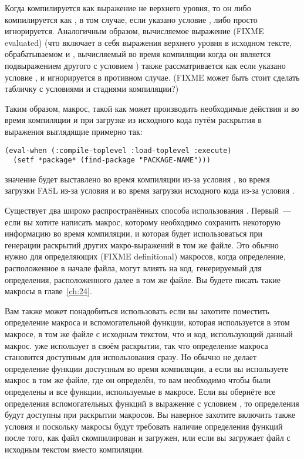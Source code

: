 Когда  компилируется как выражение не верхнего уровня, то он либо
компилируется как , в том случае, если указано условие , либо
просто игнорируется.  Аналогичным образом, вычисляемое выражение (FIXME evaluated)
 (что включает в себя выражения  верхнего уровня в
исходном тексте, обрабатываемом  и , вычисляемый во время
компиляции когда он является подвыражением другого  с условием
) также рассматривается как  если указано условие
, и игнорируется в противном случае. (FIXME может быть стоит сделать
табличку с условиями и стадиями компиляции?)

Таким образом, макрос, такой как  может производить необходимые действия
и во время компиляции и при загрузке из исходного кода путём раскрытия в выражения
 выглядящие примерно так:

\begin{lstlisting}
(eval-when (:compile-toplevel :load-toplevel :execute)
  (setf *package* (find-package "PACKAGE-NAME")))
\end{lstlisting}

\noindent{}значение  будет выставлено во время компиляции из-за условия
, во время загрузки FASL из-за условия  и во
время загрузки исходного кода из-за условия .

Существует два широко распространённых способа использования . Первый~---
если вы хотите написать макрос, которому необходимо сохранить некоторую информацию во
время компиляции, и которая будет использоваться при генерации раскрытий других
макро-выражений в том же файле.  Это обычно нужно для определяющих (FIXME definitional)
макросов, когда определение, расположенное в начале файла, могут влиять на код,
генерируемый для определения, расположенного далее в том же файле.  Вы будете писать такие
макросы в главе~\ref{ch:24}.

Вам также может понадобиться использовать  если вы захотите поместить
определение макроса и вспомогательной функции, которая используется в этом макросе, в том
же файле с исходным текстом, что и код, использующий данный макрос.  уже
использует  в своём раскрытии, так что определение макроса становится
доступным для использования сразу.  Но обычно  не делает определение функции
доступным во время компиляции, а если вы используете макрос в том же файле, где он
определён, то вам необходимо чтобы были определены и все функции, используемые в
макросе. Если вы обернёте все определения вспомогательных функций в выражение
 с условием , то определения будут доступны при
раскрытии макросов. Вы наверное захотите включить также условия  и
 поскольку макросы будут требовать наличие определения функций после того,
как файл скомпилирован и загружен, или если вы загружает файл с исходным текстом вместо
компиляции.

